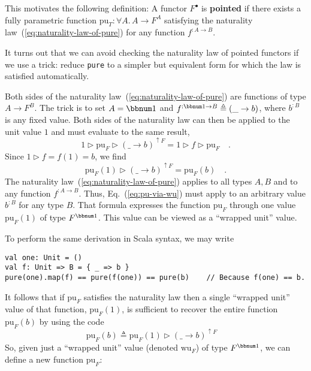 \noindent \vspace{-1.9\baselineskip}

\noindent This motivates the following definition: A functor $F^{\bullet}$
is \textbf{pointed} if there exists a fully
parametric function $\text{pu}_{T}:\forall A.\,A\rightarrow F^{A}$
satisfying the naturality law~(\ref{eq:naturality-law-of-pure})
for any function $f^{:A\rightarrow B}$.

It turns out that we can avoid checking the naturality law of pointed
functors if we use a trick: reduce \lstinline!pure! to a simpler
but equivalent form for which the law is satisfied automatically.

Both sides of the naturality law~(\ref{eq:naturality-law-of-pure})
are functions of type $A\rightarrow F^{B}$. The trick is to set $A=\bbnum 1$
and $f^{:\bbnum 1\rightarrow B}\triangleq(\_\rightarrow b)$, where
$b^{:B}$ is any fixed value. Both sides of the naturality law can
then be applied to the unit value $1$ and must evaluate to the same
result, 
\[
1\triangleright\text{pu}_{F}\triangleright(\_\rightarrow b)^{\uparrow F}=1\triangleright f\triangleright\text{pu}_{F}\quad.
\]
Since $1\triangleright f=f(1)=b$, we find
\begin{equation}
\text{pu}_{F}(1)\triangleright(\_\rightarrow b)^{\uparrow F}=\text{pu}_{F}(b)\quad.\label{eq:pu-via-wu}
\end{equation}
The naturality law~(\ref{eq:naturality-law-of-pure}) applies to
all types $A,B$ and to any function $f^{:A\rightarrow B}$. Thus,
Eq.~(\ref{eq:pu-via-wu}) must apply to an arbitrary value $b^{:B}$
for any type $B$. That formula expresses the function $\text{pu}_{F}$
through one value $\text{pu}_{F}(1)$ of type $F^{\bbnum 1}$. This
value can be viewed as a ``wrapped unit'' value. 

To perform the same derivation in Scala syntax, we may write
\begin{lstlisting}
val one: Unit = ()
val f: Unit => B = { _ => b }
pure(one).map(f) == pure(f(one)) == pure(b)    // Because f(one) == b.
\end{lstlisting}

It follows that if $\text{pu}_{F}$ satisfies the naturality law then
a single ``wrapped unit'' value of that function, $\text{pu}_{F}(1)$,
is sufficient to recover the entire function $\text{pu}_{F}(b)$ by
using the code
\[
\text{pu}_{F}(b)\triangleq\text{pu}_{F}(1)\triangleright(\_\rightarrow b)^{\uparrow F}\quad
\]
So, given just a ``wrapped unit'' value (denoted $\text{wu}_{F}$)
of type $F^{\bbnum 1}$, we can define a new function $\text{pu}_{F}$:

